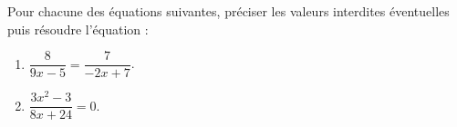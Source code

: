 \documentclass[a4paper,11pt,exos]{nsi} %
\begin{document}
\maketitle




\begin{exercice}
    Pour chacune des équations suivantes, préciser les valeurs interdites éventuelles puis résoudre l'équation :
    \begin{multicols}{3}
        \begin{enumerate}
            \item $\dfrac{8}{9x-5}=\dfrac{7}{-2x+7}$.
	        \item $\dfrac{3x^2-3}{8x+24}=0$.
	       
        \end{enumerate}
    \end{multicols}
    
\end{exercice}
\end{document}
